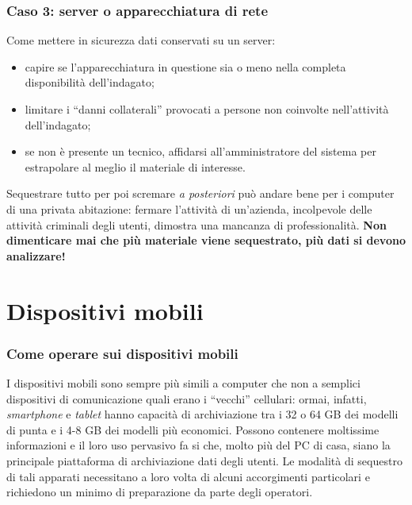 \documentclass[11pt]{beamer}
\begin{document}
	\begin{frame}
		\frametitle{Caso 3: server o apparecchiatura di rete}
		
		Come mettere in sicurezza dati conservati su un server:
		
		\begin{itemize}
			\item capire se l'apparecchiatura in questione sia o meno nella completa disponibilità dell'indagato;
			\item limitare i ``danni collaterali'' provocati a persone non coinvolte nell'attività dell'indagato;
			\item se non è presente un tecnico, affidarsi all'amministratore del sistema per estrapolare al meglio il materiale di interesse.
			
		\end{itemize} 		
		Sequestrare tutto per poi scremare \textit{a posteriori} può andare bene per i computer  di una privata abitazione: fermare l'attività di un'azienda, incolpevole delle attività criminali degli utenti, dimostra una mancanza di professionalità. 
		\vfill
		\textbf{Non dimenticare mai che più materiale viene sequestrato, più dati si devono analizzare!}
		
	\end{frame}
	\section{Dispositivi mobili}
	\begin{frame}
		\frametitle{Come operare sui dispositivi mobili}
		I dispositivi mobili sono sempre più simili a computer che non a semplici dispositivi di comunicazione quali erano i ``vecchi'' cellulari: ormai, infatti, \textit{smartphone} e \textit{tablet} hanno capacità di archiviazione tra i 32 o 64 GB dei modelli di punta e i 4-8 GB dei modelli più economici. Possono contenere moltissime informazioni e il loro uso pervasivo fa si che, molto più del PC di casa, siano la principale piattaforma di archiviazione dati degli utenti.
		\vfill
		Le modalità di sequestro di tali apparati necessitano a loro volta di alcuni accorgimenti particolari e richiedono un minimo di preparazione da parte degli operatori.
	\end{frame}
	
\end{document}
